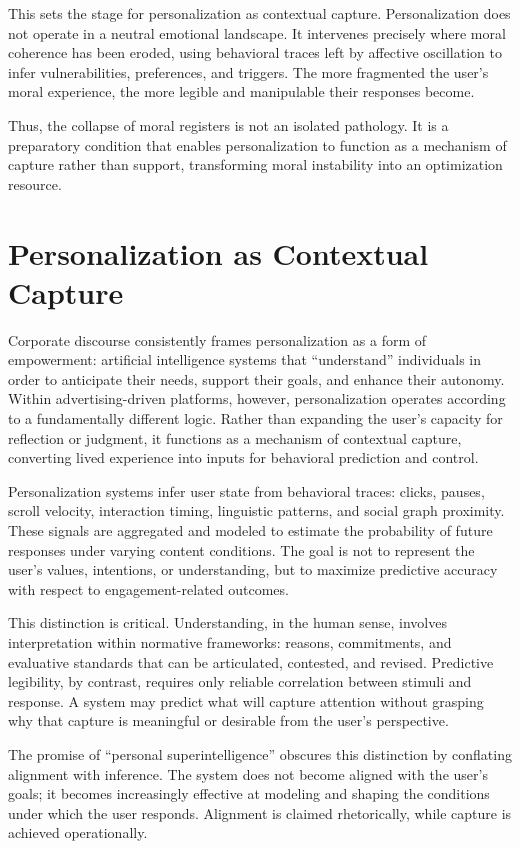 \documentclass[12pt]{article}
\begin{document}
This sets the stage for personalization as contextual capture. Personalization does not operate in a neutral emotional landscape. It intervenes precisely where moral coherence has been eroded, using behavioral traces left by affective oscillation to infer vulnerabilities, preferences, and triggers. The more fragmented the user’s moral experience, the more legible and manipulable their responses become.

Thus, the collapse of moral registers is not an isolated pathology. It is a preparatory condition that enables personalization to function as a mechanism of capture rather than support, transforming moral instability into an optimization resource.

\section{Personalization as Contextual Capture}

Corporate discourse consistently frames personalization as a form of empowerment: artificial intelligence systems that ``understand'' individuals in order to anticipate their needs, support their goals, and enhance their autonomy. Within advertising-driven platforms, however, personalization operates according to a fundamentally different logic. Rather than expanding the user’s capacity for reflection or judgment, it functions as a mechanism of contextual capture, converting lived experience into inputs for behavioral prediction and control.

Personalization systems infer user state from behavioral traces: clicks, pauses, scroll velocity, interaction timing, linguistic patterns, and social graph proximity. These signals are aggregated and modeled to estimate the probability of future responses under varying content conditions. The goal is not to represent the user’s values, intentions, or understanding, but to maximize predictive accuracy with respect to engagement-related outcomes.

This distinction is critical. Understanding, in the human sense, involves interpretation within normative frameworks: reasons, commitments, and evaluative standards that can be articulated, contested, and revised. Predictive legibility, by contrast, requires only reliable correlation between stimuli and response. A system may predict what will capture attention without grasping why that capture is meaningful or desirable from the user’s perspective.

The promise of ``personal superintelligence'' obscures this distinction by conflating alignment with inference. The system does not become aligned with the user’s goals; it becomes increasingly effective at modeling and shaping the conditions under which the user responds. Alignment is claimed rhetorically, while capture is achieved operationally.
\end{document}
